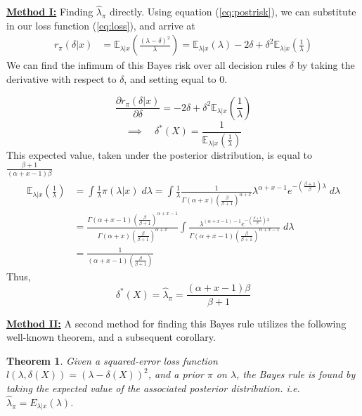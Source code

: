 \documentclass[11pt]{report}
\newtheorem{theorem}{Theorem}
\begin{document}
 
\underline{\textbf{Method I:}} Finding $\widehat{\lambda}_\pi$ directly. \newline
Using equation (\ref{eq:postrisk}), we can substitute in our loss function (\ref{eq:loss}), and arrive at  
\begin{align*}
r_\pi(\delta|x) 
& = \mathbb{E}_{\lambda|x}\left(\frac{(\lambda-\delta)^2}{\lambda}\right )  = \mathbb{E}_{\lambda|x}\left(\lambda\right) - 2\delta + \delta^2\mathbb{E}_{\lambda|x}\left(\frac{1}{\lambda}\right ) 
\end{align*}
We can find the infimum of this Bayes risk over all decision rules $\delta$ by taking the derivative with respect to $\delta$, and setting equal to 0.
		
$$\frac{\partial r_\pi(\delta|x)}{\partial \delta} =  - 2\delta + \delta^2\mathbb{E}_{\lambda|x}\left(\frac{1}{\lambda} \right )$$
$$\implies \quad \delta^*(X) = \frac{1}{\mathbb{E}_{\lambda|x}\left(\frac{1}{\lambda} \right )}$$
This expected value, taken under the posterior distribution, is equal to $\frac{\beta+1}{(\alpha +x-1)\beta}$
\begin{align*}
\mathbb{E}_{\lambda|x}\left(\frac{1}{\lambda} \right) 
& = \int \frac{1}{\lambda} \pi(\lambda|x) \; d\lambda 
= \int \frac{1}{\lambda} \frac{1}{\Gamma(\alpha+x)\left(\frac{\beta}{\beta+1}\right)^{\alpha+x}}\lambda^{\alpha+x-1}e^{-(\frac{\beta+1}{\beta})\lambda} \; d\lambda \\
& = \frac{\Gamma(\alpha+x-1)\left(\frac{\beta}{\beta+1}\right)^{\alpha+x-1}}{\Gamma(\alpha+x)\left(\frac{\beta}{\beta+1}\right)^{\alpha+x}}\int\frac{\lambda^{(\alpha+x-1)-1}e^{-(\frac{\beta+1}{\beta})\lambda}}{\Gamma(\alpha+x-1)\left(\frac{\beta}{\beta+1}\right)^{\alpha+x-1}} \; d\lambda \\
& = \frac{1}{(\alpha+x-1)\left(\frac{\beta}{\beta+1}\right)}
\end{align*}		
Thus, 
$$\delta^*(X) = \widehat{\lambda}_\pi =\frac{(\alpha +x-1)\beta}{\beta+1} $$

\underline{\textbf{Method II:}} A second method for finding this Bayes rule utilizes the following well-known theorem, and a subsequent corollary. 

\begin{theorem}
Given a squared-error loss function $l(\lambda, \delta(X)) = (\lambda - \delta(X))^2$, and a prior $\pi$ on $\lambda$, the Bayes rule is found by taking the expected value of the associated posterior distribution. i.e. $\widehat{\lambda}_\pi = E_{\lambda|x}(\lambda)$. 
\end{theorem}
\end{document}
